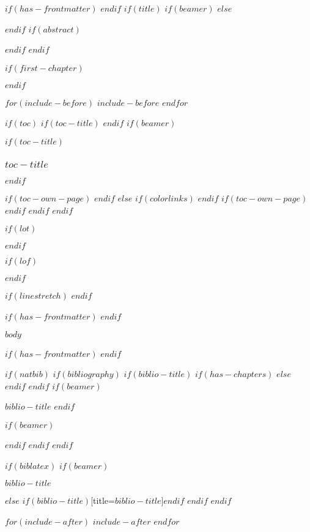 \documentclass[
$if(fontsize)$
  $fontsize$,
$endif$
$if(lang)$
  $babel-lang$,
$endif$
$if(papersize)$
  $papersize$paper,
$else$
  a4paper,
$endif$
$if(beamer)$
  ignorenonframetext,
  $if(handout)$
    handout,
  $endif$
  $if(aspectratio)$
    aspectratio=$aspectratio$,
  $endif$
$endif$
$for(classoption)$
  $classoption$$sep$,
$endfor$
captions=tableheading
]{$if(beamer)$$documentclass$$else$$if(book)$scrbook$else$scrartcl$endif$$endif$}
\newif\ifbibliography
\begin{document}
$if(has-frontmatter)$
  \frontmatter
$endif$
$if(title)$
  $if(beamer)$
  \frame{\titlepage}  
  $else$
  \maketitle
  $endif$
  $if(abstract)$
  \begin{abstract}
    $abstract$
  \end{abstract}
  $endif$
$endif$

$if(first-chapter)$
  \setcounter{chapter}{$first-chapter$}
  \addtocounter{chapter}{-1}
$endif$

$for(include-before)$
  $include-before$
$endfor$

$if(toc)$
  $if(toc-title)$
  \renewcommand*\contentsname{$toc-title$}
  $endif$
  $if(beamer)$
  \begin{frame}[allowframebreaks]
      $if(toc-title)$
    \frametitle{$toc-title$}
      $endif$
    \tableofcontents[hideallsubsections]
    \clearpage %
  \end{frame}
    $if(toc-own-page)$
  \newpage %
    $endif$
  $else$
  {
  $if(colorlinks)$
    \hypersetup{linkcolor=$if(toccolor)$$toccolor$$else$$endif$}
      $endif$
    \setcounter{tocdepth}{$if(toc-depth)$$toc-depth$$else$5$endif$}
    \tableofcontents
    \clearpage %
      $if(toc-own-page)$
    \newpage
      $endif$
  }
  $endif$
$endif$

$if(lot)$
  \listoftables
$endif$

$if(lof)$
  \listoffigures
$endif$

$if(linestretch)$
$endif$

$if(has-frontmatter)$
  \mainmatter
$endif$

$body$

$if(has-frontmatter)$
  \backmatter
$endif$

$if(natbib)$
  $if(bibliography)$
    $if(biblio-title)$
      $if(has-chapters)$
  \renewcommand\bibname{$biblio-title$}
      $else$
  \renewcommand\refname{$biblio-title$}
      $endif$
    $endif$
    $if(beamer)$
  \begin{frame}[allowframebreaks]{$biblio-title$}
    \bibliographytrue
    $endif$
    
    $if(beamer)$
  \end{frame}
    $endif$
  $endif$
$endif$

$if(biblatex)$
  $if(beamer)$
  \begin{frame}[allowframebreaks]{$biblio-title$}
    \bibliographytrue
    \printbibliography[heading=none]
  \end{frame}
  $else$
  \printbibliography$if(biblio-title)$[title=$biblio-title$]$endif$
  $endif$
$endif$

$for(include-after)$
  $include-after$
$endfor$
\end{document}
